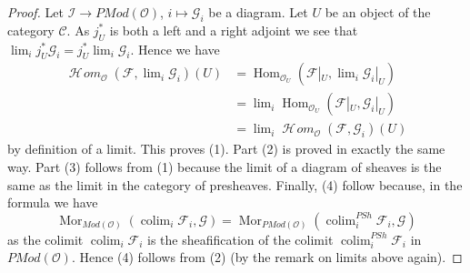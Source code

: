 \documentclass[10pt,a4paper]{amsart}
\theoremstyle{plain}
\theoremstyle{definition}
\theoremstyle{remark}
\numberwithin{equation}{subsection}
\def\lim{\mathop{\mathrm{lim}}\nolimits}
\def\colim{\mathop{\mathrm{colim}}\nolimits}
\def\Hom{\mathop{\mathrm{Hom}}\nolimits}
\def\SheafHom{\mathop{\mathcal{H}\!\mathit{om}}\nolimits}
\def\Mor{\mathop{\mathrm{Mor}}\nolimits}
\begin{document}
\begin{proof}
Let $\mathcal{I} \to \textit{PMod}(\mathcal{O})$, $i \mapsto \mathcal{G}_i$
be a diagram. Let $U$ be an object of the category $\mathcal{C}$.
As $j_U^*$ is both a left and a right adjoint we see that
$\lim_i j_U^*\mathcal{G}_i = j_U^* \lim_i \mathcal{G}_i$.
Hence we have
\begin{align*}
\SheafHom_\mathcal{O}(\mathcal{F}, \lim_i \mathcal{G}_i)(U)
& =
\Hom_{\mathcal{O}_U}(\mathcal{F}|_U, \lim_i \mathcal{G}_i|_U) \\
& =
\lim_i \Hom_{\mathcal{O}_U}(\mathcal{F}|_U, \mathcal{G}_i|_U) \\
& = \lim_i \SheafHom_\mathcal{O}(\mathcal{F}, \mathcal{G}_i)(U)
\end{align*}
by definition of a limit. This proves (1). Part (2) is proved in exactly the
same way. Part (3) follows from (1) because the limit of a diagram of sheaves
is the same as the limit in the category of presheaves.
Finally, (4) follow because, in the formula we have
$$
\Mor_{\textit{Mod}(\mathcal{O})}(
\colim_i \mathcal{F}_i, \mathcal{G})
=
\Mor_{\textit{PMod}(\mathcal{O})}(
\colim^{PSh}_i \mathcal{F}_i, \mathcal{G})
$$
as the colimit $\colim_i \mathcal{F}_i$ is the sheafification of
the colimit $\colim^{PSh}_i \mathcal{F}_i$ in
$\textit{PMod}(\mathcal{O})$. Hence (4) follows from (2)
(by the remark on limits above again).
\end{proof}
\end{document}
